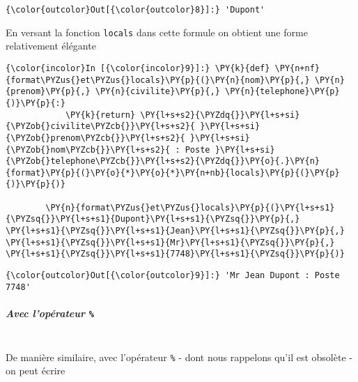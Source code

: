 \begin{Verbatim}[commandchars=\\\{\}]
{\color{outcolor}Out[{\color{outcolor}8}]:} 'Dupont'
\end{Verbatim}
            
    En versant la fonction \texttt{locals} dans cette formule on obtient une
forme relativement élégante

    \begin{Verbatim}[commandchars=\\\{\}]
{\color{incolor}In [{\color{incolor}9}]:} \PY{k}{def} \PY{n+nf}{format\PYZus{}et\PYZus{}locals}\PY{p}{(}\PY{n}{nom}\PY{p}{,} \PY{n}{prenom}\PY{p}{,} \PY{n}{civilite}\PY{p}{,} \PY{n}{telephone}\PY{p}{)}\PY{p}{:}
            \PY{k}{return} \PY{l+s+s2}{\PYZdq{}}\PY{l+s+si}{\PYZob{}civilite\PYZcb{}}\PY{l+s+s2}{ }\PY{l+s+si}{\PYZob{}prenom\PYZcb{}}\PY{l+s+s2}{ }\PY{l+s+si}{\PYZob{}nom\PYZcb{}}\PY{l+s+s2}{ : Poste }\PY{l+s+si}{\PYZob{}telephone\PYZcb{}}\PY{l+s+s2}{\PYZdq{}}\PY{o}{.}\PY{n}{format}\PY{p}{(}\PY{o}{*}\PY{o}{*}\PY{n+nb}{locals}\PY{p}{(}\PY{p}{)}\PY{p}{)}
        
        \PY{n}{format\PYZus{}et\PYZus{}locals}\PY{p}{(}\PY{l+s+s1}{\PYZsq{}}\PY{l+s+s1}{Dupont}\PY{l+s+s1}{\PYZsq{}}\PY{p}{,} \PY{l+s+s1}{\PYZsq{}}\PY{l+s+s1}{Jean}\PY{l+s+s1}{\PYZsq{}}\PY{p}{,} \PY{l+s+s1}{\PYZsq{}}\PY{l+s+s1}{Mr}\PY{l+s+s1}{\PYZsq{}}\PY{p}{,} \PY{l+s+s1}{\PYZsq{}}\PY{l+s+s1}{7748}\PY{l+s+s1}{\PYZsq{}}\PY{p}{)}
\end{Verbatim}


\begin{Verbatim}[commandchars=\\\{\}]
{\color{outcolor}Out[{\color{outcolor}9}]:} 'Mr Jean Dupont : Poste 7748'
\end{Verbatim}
            
    \hypertarget{avec-lopuxe9rateur}{%
\subparagraph{\texorpdfstring{Avec l'opérateur
\texttt{\%}}{Avec l'opérateur \%}\\\\}\label{avec-lopuxe9rateur}}

    De manière similaire, avec l'opérateur \texttt{\%} - dont nous rappelons
qu'il est obsolète - on peut écrire

